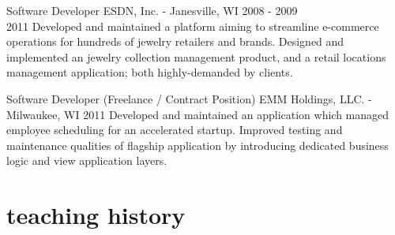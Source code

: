 \documentclass[]{clean-resume}
\begin{document}
\entry
  {Software Developer}
  {ESDN, Inc. - Janesville, WI \vspace{-3mm}}
  {2008 - 2009 \\ 2011}
  {
    Developed and maintained a platform aiming to streamline e-commerce operations for hundreds of jewelry retailers and brands. Designed and implemented an jewelry collection management product, and a retail locations management application; both highly-demanded by clients.
  }

\entry
  {Software Developer (Freelance / Contract Position)}
  {EMM Holdings, LLC. - Milwaukee, WI}
  {2011}
  {
    Developed and maintained an application which managed employee scheduling for an accelerated startup. Improved testing and maintenance qualities of flagship application by introducing dedicated business logic and view application layers.
  }


\pagebreak

\section{teaching history}
\end{document}
